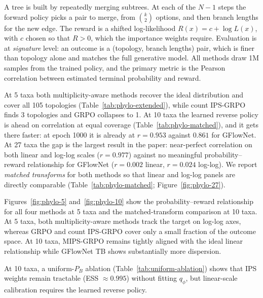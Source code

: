 \documentclass[11pt]{article}
\begin{document}
A tree is built by repeatedly merging subtrees. At each of the $N-1$ steps the
forward policy picks a pair to merge, from $\binom{k}{2}$ options, and then
branch lengths for the new edge. The reward is a shifted log-likelihood
$R(x) = c + \log L(x)$, with $c$ chosen so that $R > 0$, which the importance
weights require. Evaluation is at \emph{signature} level: an outcome is a
(topology, branch lengths) pair, which is finer than topology alone and matches
the full generative model. All methods draw 1M samples from the trained policy,
and the primary metric is the Pearson correlation between estimated terminal
probability and reward.







At 5 taxa both multiplicity-aware methods recover the ideal distribution and
cover all 105 topologies (Table~\ref{tab:phylo-extended}), while count IPS-GRPO
finds 3 topologies and GRPO collapses to 1. At 10 taxa the learned reverse
policy is ahead on correlation at equal coverage (Table~\ref{tab:phylo-matched}),
and it gets there faster: at epoch 1000 it is already at $r = 0.953$ against
$0.861$ for GFlowNet. At 27 taxa the gap is the largest result in the paper:
near-perfect correlation on both linear and log-log scales ($r = 0.977$) against
no meaningful probability--reward relationship for GFlowNet ($r = 0.002$ linear,
$r = 0.024$ log-log). We report \emph{matched transforms} for both methods so
that linear and log-log panels are directly comparable
(Table~\ref{tab:phylo-matched}; Figure~\ref{fig:phylo-27}).

Figures~\ref{fig:phylo-5} and~\ref{fig:phylo-10} show the probability--reward
relationship for all four methods at 5 taxa and the matched-transform comparison
at 10 taxa. At 5 taxa, both multiplicity-aware methods track the target on
log-log axes, whereas GRPO and count IPS-GRPO cover only a small fraction of the
outcome space. At 10 taxa, MIPS-GRPO remains tightly aligned with the ideal
linear relationship while GFlowNet TB shows substantially more dispersion.



At 10 taxa, a uniform-$P_B$ ablation (Table~\ref{tab:uniform-ablation}) shows
that IPS weights remain tractable (ESS $\approx 0.995$) without fitting
$q_\phi$, but linear-scale calibration requires the learned reverse policy.
\end{document}
